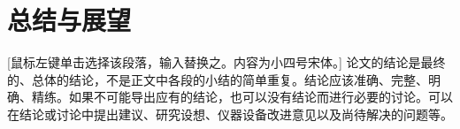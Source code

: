 \chapter{总结与展望}

[鼠标左键单击选择该段落，输入替换之。内容为小四号宋体。] 论文的结论是最终的、总体的结论，不是正文中各段的小结的简单重复。结论应该准确、完整、明确、精练。如果不可能导出应有的结论，也可以没有结论而进行必要的讨论。可以在结论或讨论中提出建议、研究设想、仪器设备改进意见以及尚待解决的问题等。

